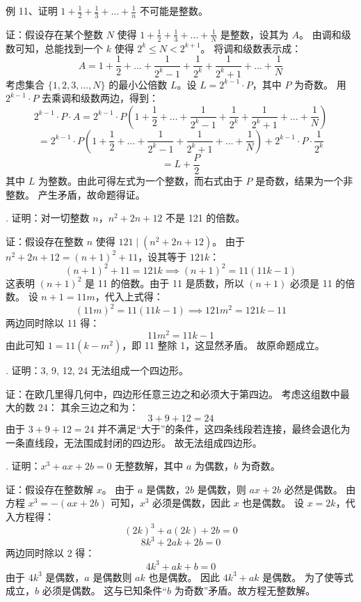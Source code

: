 \begin{questions}
\question 例 11、证明 $1 + \frac{1}{2} + \frac{1}{3} + \dots + \frac{1}{n}$ 不可能是整数。

\begin{solution}
证：假设存在某个整数 $N$ 使得 $1 + \frac{1}{2} + \frac{1}{3} + \dots + \frac{1}{N}$ 是整数，设其为 $A$。
由调和级数可知，总能找到一个 $k$ 使得 $2^k \leq N < 2^{k+1}$。
将调和级数表示成：
\[
A = 1 + \frac{1}{2} + \dots + \frac{1}{2^k-1} + \frac{1}{2^k} + \frac{1}{2^k+1} + \dots + \frac{1}{N}
\]
考虑集合 $\{1, 2, 3, \dots, N\}$ 的最小公倍数 $L$。设 $L = 2^{k-1} \cdot P$，其中 $P$ 为奇数。
用 $2^{k-1} \cdot P$ 去乘调和级数两边，得到：
\[
2^{k-1} \cdot P \cdot A = 2^{k-1} \cdot P \left( 1 + \frac{1}{2} + \dots + \frac{1}{2^k-1} + \frac{1}{2^k} + \frac{1}{2^k+1} + \dots + \frac{1}{N} \right)
\]
\[
= 2^{k-1} \cdot P \left( 1 + \frac{1}{2} + \dots + \frac{1}{2^k-1} + \frac{1}{2^k+1} + \dots + \frac{1}{N} \right) + 2^{k-1} \cdot P \cdot \frac{1}{2^k}
\]
\[
= L + \frac{P}{2}
\]
其中 $L$ 为整数。由此可得左式为一个整数，而右式由于 $P$ 是奇数，结果为一个非整数。
产生矛盾，故命题得证。
\end{solution}

. 证明：对一切整数 $n$，$n^2 + 2n + 12$ 不是 121 的倍数。

\begin{solution}
证：假设存在整数 $n$ 使得 $121 \mid (n^2 + 2n + 12)$。
由于 $n^2 + 2n + 12 = (n+1)^2 + 11$，设其等于 $121k$：
\[
(n+1)^2 + 11 = 121k \implies (n+1)^2 = 11(11k - 1)
\]
这表明 $(n+1)^2$ 是 11 的倍数。由于 11 是质数，所以 $(n+1)$ 必须是 11 的倍数。
设 $n+1 = 11m$，代入上式得：
\[
(11m)^2 = 11(11k - 1) \implies 121m^2 = 121k - 11
\]
两边同时除以 11 得：
\[
11m^2 = 11k - 1
\]
由此可知 $1 = 11(k - m^2)$，即 11 整除 1，这显然矛盾。
故原命题成立。
\end{solution}

. 证明：3, 9, 12, 24 无法组成一个四边形。

\begin{solution}
证：在欧几里得几何中，四边形任意三边之和必须大于第四边。
考虑这组数中最大的数 24：
其余三边之和为：
\[
3 + 9 + 12 = 24
\]
由于 $3 + 9 + 12 = 24$ 并不满足“大于”的条件，这四条线段若连接，最终会退化为一条直线段，无法围成封闭的四边形。
故无法组成四边形。
\end{solution}

. 证明：$x^3 + ax + 2b = 0$ 无整数解，其中 $a$ 为偶数，$b$ 为奇数。

\begin{solution}
证：假设存在整数解 $x$。
由于 $a$ 是偶数，$2b$ 是偶数，则 $ax + 2b$ 必然是偶数。
由方程 $x^3 = -(ax + 2b)$ 可知，$x^3$ 必须是偶数，因此 $x$ 也是偶数。
设 $x = 2k$，代入方程得：
\[
(2k)^3 + a(2k) + 2b = 0
\]
\[
8k^3 + 2ak + 2b = 0
\]
两边同时除以 2 得：
\[
4k^3 + ak + b = 0
\]
由于 $4k^3$ 是偶数，$a$ 是偶数则 $ak$ 也是偶数。
因此 $4k^3 + ak$ 是偶数。
为了使等式成立，$b$ 必须是偶数。
这与已知条件“$b$ 为奇数”矛盾。故方程无整数解。
\end{solution}


\end{questions}

